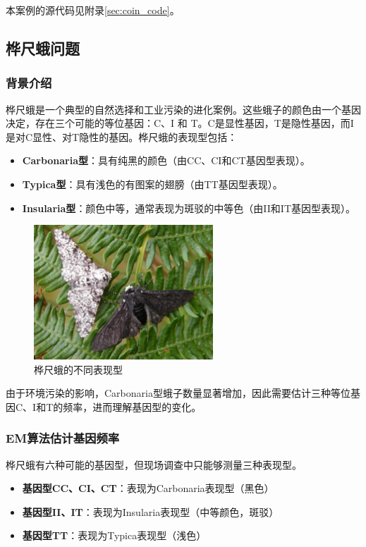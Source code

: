 \documentclass[a4paper,12pt]{ctexart} %
\begin{document}
本案例的源代码见附录\ref{sec:coin_code}。

\subsection{桦尺蛾问题}

\subsubsection{背景介绍}
桦尺蛾是一个典型的自然选择和工业污染的进化案例。这些蛾子的颜色由一个基因决定，存在三个可能的等位基因：C、I 和 T。C是显性基因，T是隐性基因，而I是对C显性、对T隐性的基因。桦尺蛾的表现型包括：

\begin{itemize}
    \item \textbf{Carbonaria型}：具有纯黑的颜色（由CC、CI和CT基因型表现）。
    \item \textbf{Typica型}：具有浅色的有图案的翅膀（由TT基因型表现）。
    \item \textbf{Insularia型}：颜色中等，通常表现为斑驳的中等色（由II和IT基因型表现）。
\end{itemize}

\begin{figure}[htbp]
    \centering
    \includegraphics[width=0.6\textwidth]{fig/桦尺蛾.png}
    \caption{桦尺蛾的不同表现型}
    \label{fig:moths}
\end{figure}

由于环境污染的影响，Carbonaria型蛾子数量显著增加，因此需要估计三种等位基因C、I和T的频率，进而理解基因型的变化。

\subsubsection{EM算法估计基因频率}
桦尺蛾有六种可能的基因型，但现场调查中只能够测量三种表现型。
\begin{itemize}
    \item \textbf{基因型CC、CI、CT}：表现为Carbonaria表现型（黑色）
    \item \textbf{基因型II、IT}：表现为Insularia表现型（中等颜色，斑驳）
    \item \textbf{基因型TT}：表现为Typica表现型（浅色）
\end{itemize}
\end{document}

